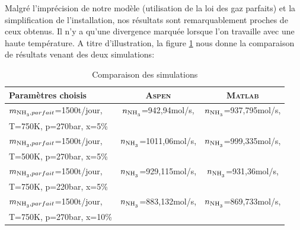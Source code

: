 Malgré l'imprécision de notre modèle (utilisation
de la loi des gaz parfaits) et la simplification
de l'installation, nos résultats sont 
remarquablement proches de ceux obtenus. Il n'y
a qu'une divergence marquée lorsque l'on travaille 
avec une haute température. A titre d'illustration, 
la figure \ref{tab:sim} nous donne la comparaison 
de résultats venant des deux simulations:

\begin{table}[h!]
	\centering
	\begin{tabular}{l|c|c}
		Paramètres choisis & \textsc{Aspen} & \textsc{Matlab}\\
		\hline
		$m_{\ce{NH3}, parfait}$=1500t/jour, & $n_{\ce{NH3}}$=942,94mol/s, & $n_{\ce{NH3}}$=937,795mol/s,\\
		T=750K, p=270bar, x=5\%             &   &  \\
		\hline
		$m_{\ce{NH3}, parfait}$=1500t/jour, & $n_{\ce{NH3}}$=1011,06mol/s, & $n_{\ce{NH3}}$=999,335mol/s,\\
		T=500K, p=270bar, x=5\%             &   &  \\
		\hline
		$m_{\ce{NH3}, parfait}$=1500t/jour, & $n_{\ce{NH3}}$=929,115mol/s, & $n_{\ce{NH3}}$=931,36mol/s,\\
		T=750K, p=220bar, x=5\%             &   &  \\
		\hline
		$m_{\ce{NH3}, parfait}$=1500t/jour, & $n_{\ce{NH3}}$=883,132mol/s, & $n_{\ce{NH3}}$=869,733mol/s,\\
		T=750K, p=270bar, x=10\%             &   &  \\
		\hline

	\end{tabular}
	\caption{Comparaison des simulations}
	\label{tab:sim}
\end{table}

\appendix




